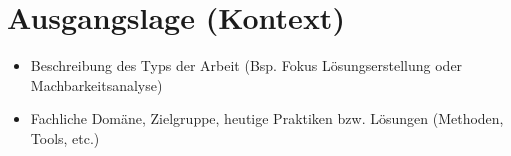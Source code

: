 \section{Ausgangslage (Kontext)}

\begin{itemize}	
	\item Beschreibung des Typs der Arbeit (Bsp. Fokus Lösungserstellung oder Machbarkeitsanalyse)
	\item Fachliche Domäne, Zielgruppe, heutige Praktiken bzw. Lösungen (Methoden, Tools, etc.)
\end{itemize}